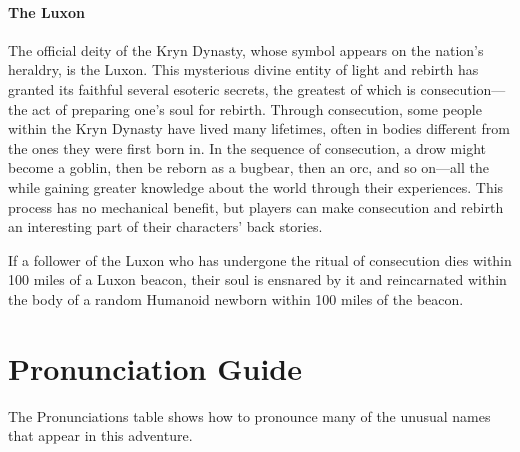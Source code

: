 \documentclass[10pt,a4paper,twoside,bg=print,twocolumn,openany,nodeprecatedcode]{dndbook}
\begin{document}
\paragraph{The Luxon}
The official deity of the Kryn Dynasty, whose symbol appears on the nation's heraldry, is the Luxon. This mysterious divine entity of light and rebirth has granted its faithful several esoteric secrets, the greatest of which is consecution—the act of preparing one's soul for rebirth. Through consecution, some people within the Kryn Dynasty have lived many lifetimes, often in bodies different from the ones they were first born in. In the sequence of consecution, a drow might become a goblin, then be reborn as a bugbear, then an orc, and so on—all the while gaining greater knowledge about the world through their experiences. This process has no mechanical benefit, but players can make consecution and rebirth an interesting part of their characters' back stories.

If a follower of the Luxon who has undergone the ritual of consecution dies within 100 miles of a Luxon beacon, their soul is ensnared by it and reincarnated within the body of a random Humanoid newborn within 100 miles of the beacon.

\section{Pronunciation Guide}
The Pronunciations table shows how to pronounce many of the unusual names that appear in this adventure.
\end{document}
